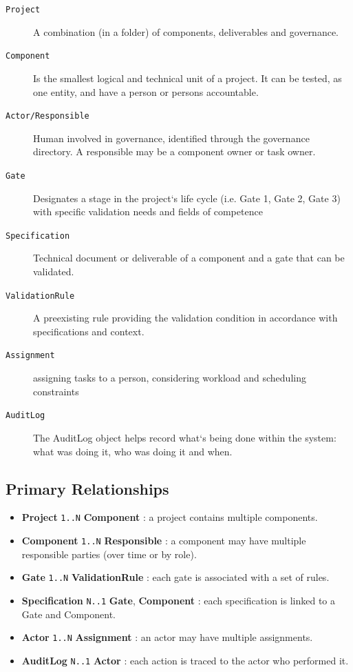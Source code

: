 \begin{description}
    \item[\texttt{Project}] A combination (in a folder) of components, deliverables and governance.
    
    \item[\texttt{Component}] Is the smallest logical and technical unit of a project. It can be tested, as one entity, and have a person or persons accountable.
    
    \item[\texttt{Actor/Responsible}] Human involved in governance, identified through the governance directory. A responsible may be a component owner or task owner.
    
    \item[\texttt{Gate}] Designates a stage in the project‘s life cycle (i.e. Gate 1, Gate 2, Gate 3) with specific validation needs and fields of competence
    
    \item[\texttt{Specification}] Technical document or deliverable of a component and a gate that can be validated.
    
    \item[\texttt{ValidationRule}] A preexisting rule providing the validation condition in accordance with specifications and context.
    
    \item[\texttt{Assignment}] assigning tasks to a person, considering workload and scheduling constraints
    
    \item[\texttt{AuditLog}] The AuditLog object helps record what‘s being done within the system: what was doing it, who was doing it and when.
\end{description}

\subsection*{\textcolor[HTML]{003D99}{Primary Relationships}}

\begin{itemize}
    \item \textcolor[HTML]{003D99}{\textbf{Project} \texttt{1..N} \textbf{Component}} : a project contains multiple components.
    \item \textcolor[HTML]{003D99}{\textbf{Component} \texttt{1..N} \textbf{Responsible}} : a component may have multiple responsible parties (over time or by role).
    \item \textcolor[HTML]{003D99}{\textbf{Gate} \texttt{1..N} \textbf{ValidationRule}} : each gate is associated with a set of rules.
    \item \textcolor[HTML]{003D99}{\textbf{Specification} \texttt{N..1} \textbf{Gate}, \textbf{Component}} : each specification is linked to a Gate and Component.
    \item \textcolor[HTML]{003D99}{\textbf{Actor} \texttt{1..N} \textbf{Assignment}} : an actor may have multiple assignments.
    \item \textcolor[HTML]{003D99}{\textbf{AuditLog} \texttt{N..1} \textbf{Actor}} : each action is traced to the actor who performed it.
\end{itemize}

